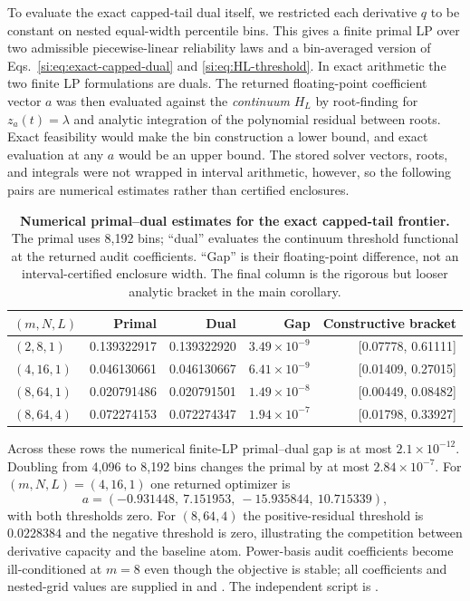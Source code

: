 To evaluate the exact capped-tail dual itself, we restricted each derivative
$q$ to be constant on nested equal-width percentile bins. This gives a finite
primal LP over two admissible piecewise-linear reliability laws and a
bin-averaged version of Eqs.~\ref{si:eq:exact-capped-dual} and
\ref{si:eq:HL-threshold}. In exact arithmetic the two finite LP formulations
are duals. The returned floating-point coefficient vector $a$ was then
evaluated against the \emph{continuum}
$H_L$ by root-finding for $z_a(t)=\lambda$ and analytic integration of the
polynomial residual between roots. Exact feasibility would make the bin
construction a lower bound, and exact evaluation at any $a$ would be an upper
bound. The stored solver vectors, roots, and integrals were not wrapped in
interval arithmetic, however, so the following pairs are numerical estimates
rather than certified enclosures.

\begin{table}[h]
\centering
\caption{\textbf{Numerical primal--dual estimates for the exact capped-tail frontier.} The primal uses 8,192 bins; ``dual'' evaluates the continuum threshold functional at the returned audit coefficients. ``Gap'' is their floating-point difference, not an interval-certified enclosure width. The final column is the rigorous but looser analytic bracket in the main corollary.}
\label{si:tab:capped-dual-checks}
\begin{tabular}{lrrrr}
\toprule
$(m,N,L)$ & Primal & Dual & Gap & Constructive bracket \\
\midrule
$(2,8,1)$  & 0.139322917 & 0.139322920 & $3.49\times10^{-9}$ & [0.07778, 0.61111] \\
$(4,16,1)$ & 0.046130661 & 0.046130667 & $6.41\times10^{-9}$ & [0.01409, 0.27015] \\
$(8,64,1)$ & 0.020791486 & 0.020791501 & $1.49\times10^{-8}$ & [0.00449, 0.08482] \\
$(8,64,4)$ & 0.072274153 & 0.072274347 & $1.94\times10^{-7}$ & [0.01798, 0.33927] \\
\bottomrule
\end{tabular}
\end{table}

Across these rows the numerical finite-LP primal--dual gap is at most
$2.1\times10^{-12}$. Doubling from 4,096 to 8,192 bins changes the primal by
at most $2.84\times10^{-7}$. For $(m,N,L)=(4,16,1)$ one returned optimizer is
\[
a=(-0.931448,\ 7.151953,\ -15.935844,\ 10.715339),
\]
with both thresholds zero. For
$(8,64,4)$ the positive-residual threshold is $0.0228384$ and the negative
threshold is zero, illustrating the competition between derivative capacity
and the baseline atom. Power-basis audit coefficients become ill-conditioned
at $m=8$ even though the objective is stable; all coefficients and nested-grid
values are supplied in
 and
. The independent script is
.

